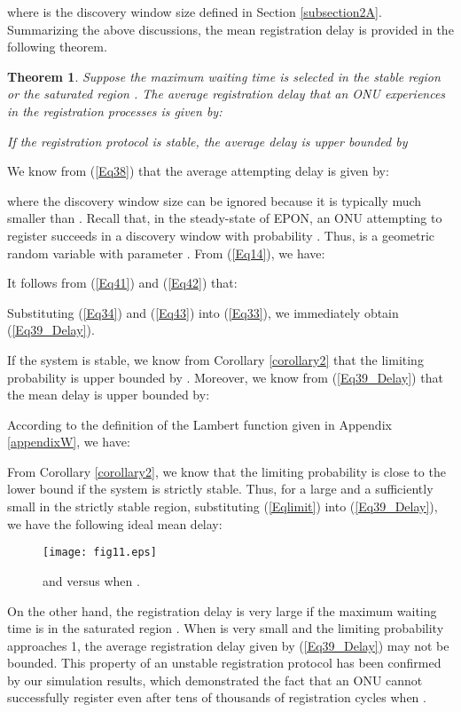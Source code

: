 \documentclass[journal]{IEEEtran}
\newtheorem{theorem}{\textbf{Theorem}}
\begin{document}
where  is the discovery window size defined in Section \ref{subsection2A}. Summarizing the above discussions, the mean registration delay is provided in the following theorem.
\begin{theorem}\label{theorem2}
  Suppose the maximum waiting time is selected in the stable region  or the saturated region . The average registration delay that an ONU experiences in the registration processes is given by:

If the registration protocol is stable, the average delay is upper bounded by

\end{theorem}
\begin{IEEEproof}
We know from (\ref{Eq38}) that the average attempting delay is given by:

where the discovery window size  can be ignored because it is typically much smaller than . Recall that, in the steady-state of EPON, an ONU attempting to register succeeds in a discovery window with probability . Thus,  is a geometric random variable with parameter . From (\ref{Eq14}), we have:

It follows from (\ref{Eq41}) and (\ref{Eq42}) that:

Substituting (\ref{Eq34}) and (\ref{Eq43}) into (\ref{Eq33}), we immediately obtain (\ref{Eq39_Delay}).

If the system is stable,  we know from Corollary \ref{corollary2} that the limiting probability  is upper bounded by . Moreover, we know from (\ref{Eq39_Delay}) that the mean delay is upper bounded by:

According to the definition of the Lambert  function  given in Appendix \ref{appendixW}, we have:

\end{IEEEproof}

From Corollary \ref{corollary2}, we know that the limiting probability  is close to the lower bound if the system is strictly stable. Thus, for a large  and a sufficiently small  in the strictly stable region, substituting (\ref{Eqlimit}) into (\ref{Eq39_Delay}), we have the following ideal mean delay:


\begin{figure}[t]
\centering
\texttt{[image: fig11.eps]}
\caption{ and  versus  when .}\label{fig11}
\end{figure}

On the other hand, the registration delay is very large if the maximum waiting time  is in the saturated region . When  is very small and the limiting probability  approaches 1, the average registration delay   given by (\ref{Eq39_Delay}) may not be bounded. This property of an unstable registration protocol has been confirmed by our simulation results, which demonstrated the fact that an ONU cannot successfully register even after tens of thousands of registration cycles when .
\end{document}
